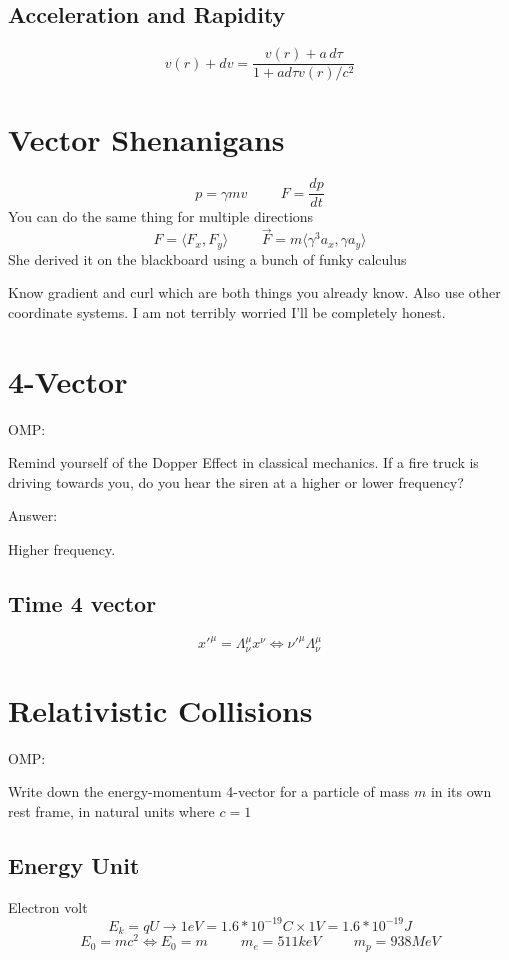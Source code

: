 \documentclass{report}
\newcommand{\hp}{\hspace{1cm}}
\begin{document}
\section{Acceleration and Rapidity}
\[
v(r) + dv = \frac{v(r) + a \, d\tau}{1 + ad\tau v(r)/c^2}
\]



\chapter{Vector Shenanigans}
\[
p = \gamma m v
\hp
F = \frac{dp}{dt}
\]
You can do the same thing for multiple directions
\[
F = \langle F_x, F_y \rangle
\hp
\vec{F} = m \langle \gamma^3a_x, \gamma a_y \rangle
\]
She derived it on the blackboard using a bunch of funky calculus

Know gradient and curl which are both things you already know. Also use other coordinate systems. I am not terribly worried I'll be completely honest.



\chapter{4-Vector}
OMP:

Remind yourself of the Dopper Effect in classical mechanics. If a fire truck is driving towards you, do you hear the siren at a higher or lower frequency?

Answer:

Higher frequency.


\section{Time 4 vector}
\[
x'^\mu = \Lambda^\mu_\nu x^\nu \iff \nu'^\mu \Lambda^\mu_\nu
\]


\chapter{Relativistic Collisions}
OMP: 

Write down the energy-momentum 4-vector for a particle of mass $m$ in its own rest frame, in natural units where $c = 1$


\section{Energy Unit}
Electron volt
\[
E_k = qU \rightarrow 1 eV = 1.6 * 10^{-19} C \times 1 V = 1.6 * 10^{-19} J
\]
\[
E_0 = mc^2 \iff E_0 = m
\hp
m_e = 511 keV
\hp
m_p = 938 MeV
\]
\end{document}
